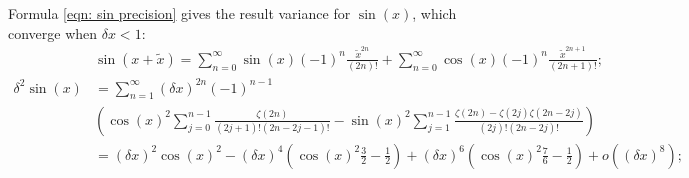 \documentclass[twoside]{article}
\numberwithin{equation}{section}
\begin{document}
Formula \eqref{eqn: sin precision} gives the result variance for $\sin(x)$, which converge when $\delta x < 1$:
\begin{align}
\label{eqn: sin Taylor}
& \sin(x + \tilde{x}) = \sum_{n=0}^{\infty} \sin(x) (-1)^{n} \frac{\tilde{x}^{2n}}{(2n)!} + \sum_{n=0}^{\infty} \cos(x) (-1)^n \frac{\tilde{x}^{2n+1}}{(2n + 1)!}; \\
\label{eqn: sin precision}
\delta^2 \sin(x) &= \sum_{n=1}^{\infty} (\delta x)^{2n} (-1)^{n - 1} \nonumber \\
 & \left( \cos(x)^2 \sum_{j=0}^{n-1} \frac{\zeta(2n)}{(2j+1)!(2n-2j-1)!}
      - \sin(x)^2 \sum_{j=1}^{n-1} \frac{\zeta(2n) - \zeta(2j) \zeta(2n-2j)}{(2j)!(2n-2j)!} \right) \\ 
 &=  (\delta x)^2 \cos(x)^2 - (\delta x)^4 (\cos(x)^2 \frac{3}{2} - \frac{1}{2}) + (\delta x)^6 (\cos(x)^2 \frac{7}{6} - \frac{1}{2})  + o((\delta x)^8);
\end{align}
\end{document}
